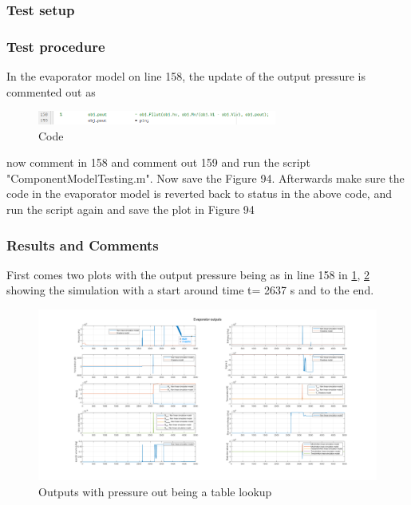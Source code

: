 \subsubsection*{Test setup}


\subsubsection*{Test procedure}
In the evaporator model on line 158, the update of the output pressure is commented out as

\begin{figure}[h!]
	\centering
	\includegraphics[width=0.7\textwidth]{Tests/Evapo_test1/pout_code.png}
	\caption{Code}
	\label{fig:evapotest1_code}
\end{figure}

now comment in 158 and comment out 159
and run the script "ComponentModelTesting.m". Now save the Figure 94.
Afterwards make sure the code in the evaporator model is reverted back to status in the above code, and run the script again and save the plot in Figure 94


\subsubsection*{Results and Comments}
First comes two plots with the output pressure being as in line 158 in \cref{fig:evapotest1_code}, \cref{fig:evapotest_plot1} showing the simulation with a start around time t= 2637 s and to the end.

\begin{figure}[h]
	\centering
	\includegraphics[width=2.1\textwidth]{Tests/Evapo_test1/plot_unstable.png}
	\caption{Outputs with pressure out being a table lookup}
	\label{fig:evapotest_plot1}
\end{figure}

